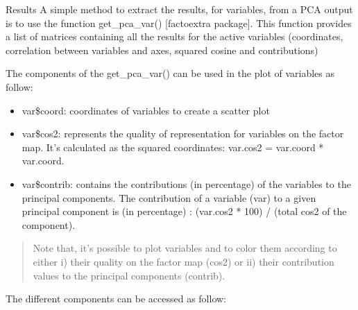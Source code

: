 \documentclass[]{book}
\newenvironment{Shaded}{\begin{snugshade}}{\end{snugshade}}
\newcommand{\CommentTok}[1]{\textcolor[rgb]{0.56,0.35,0.01}{\textit{#1}}}
\newcommand{\KeywordTok}[1]{\textcolor[rgb]{0.13,0.29,0.53}{\textbf{#1}}}
\newcommand{\NormalTok}[1]{#1}
\newcommand{\StringTok}[1]{\textcolor[rgb]{0.31,0.60,0.02}{#1}}
\providecommand{\tightlist}{%
  \setlength{\itemsep}{0pt}\setlength{\parskip}{0pt}}
\begin{document}
Results
A simple method to extract the results, for variables, from a PCA output is to use the function get\_pca\_var() {[}factoextra package{]}. This function provides a list of matrices containing all the results for the active variables (coordinates, correlation between variables and axes, squared cosine and contributions)

\begin{Shaded}
\end{Shaded}

The components of the get\_pca\_var() can be used in the plot of variables as follow:

\begin{itemize}
\tightlist
\item
  var\$coord: coordinates of variables to create a scatter plot
\item
  var\$cos2: represents the quality of representation for variables on the factor map. It's calculated as the squared coordinates: var.cos2 = var.coord * var.coord.
\item
  var\$contrib: contains the contributions (in percentage) of the variables to the principal components. The contribution of a variable (var) to a given principal component is (in percentage) : (var.cos2 * 100) / (total cos2 of the component).
\end{itemize}

\begin{quote}
Note that, it's possible to plot variables and to color them according to either i) their quality on the factor map (cos2) or ii) their contribution values to the principal components (contrib).
\end{quote}

The different components can be accessed as follow:
\end{document}

